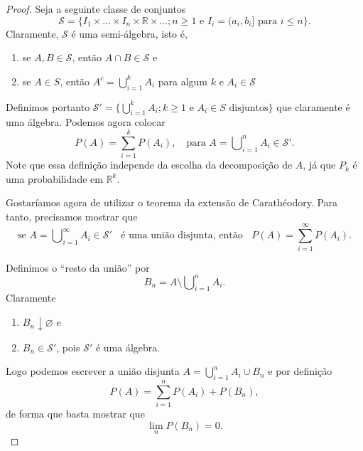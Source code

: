 \documentclass[reqno, draft]{book}
\newcommand*\1{\mathds{1}}
\DeclareMathOperator*{\mcup}{{\textstyle \bigcup}}
\begin{document}
\begin{proof}
  Seja a seguinte classe de conjuntos
  \begin{equation}
    \mathcal{S} = \big\{I_1 \times \dots \times I_n \times \mathbb{R} \times \dots; n \geq 1 \text{ e } I_i = (a_i, b_i] \text{ para $i \leq n$} \big\}.
  \end{equation}
  Claramente, $\mathcal{S}$ é uma semi-álgebra, isto é, 
  \begin{enumerate}[\quad a)]
  \item se $A, B \in \mathcal{S}$, então $A \cap B \in \mathcal{S}$ e
  \item se $A \in S$, então $A^c = \bigcup_{i = 1}^k A_i$ para algum $k$ e $A_i \in \mathcal{S}$
  \end{enumerate}

  Definimos portanto $\mathcal{S}' = \big\{ \bigcup_{i=1}^k A_i; k \geq 1 \text{ e $A_i \in S$ disjuntos}\big\}$ que claramente é uma álgebra.
  Podemos agora colocar
  \begin{equation}
    P(A) = \sum_{i=1}^k P(A_i), \quad \text{para $A = \mcup_{i=1}^n A_i \in \mathcal{S}'$}.
  \end{equation}
  Note que essa definição independe da escolha da decomposição de $A$, já que $P_k$ é uma probabilidade em $\mathbb{R}^k$.

  Gostaríamos agora de utilizar o teorema da extensão de Carathéodory.
  Para tanto, precisamos mostrar que
  \begin{equation}
    \text{se $A = \mcup_{i=1}^\infty A_i \in \mathcal{S}' \;\;$ é uma união disjunta, então $\;\; \textstyle{P(A) = \sum\limits_{i=1}^\infty P(A_i)}$}.
  \end{equation}

  Definimos o ``resto da união'' por
  \begin{equation}
    B_n = A \setminus \mcup_{i=1}^n A_i.
  \end{equation}
  Claramente
  \begin{enumerate}[\quad a)]
  \item $B_n \downarrow \varnothing$ e
  \item $B_n \in \mathcal{S}'$, pois $\mathcal{S}'$ é uma álgebra.
  \end{enumerate}

  Logo podemos escrever a união disjunta $A = \bigcup_{i=1}^n A_i \cup B_n$ e por definição
  \begin{equation}
    P(A) = \sum_{i=1}^n P(A_i) + P(B_n),
  \end{equation}
  de forma que basta mostrar que
  \begin{equation}
    \label{e:B_n_cont_vazio}
    \lim_n P(B_n) = 0.
  \end{equation}


\end{proof}
\end{document}

